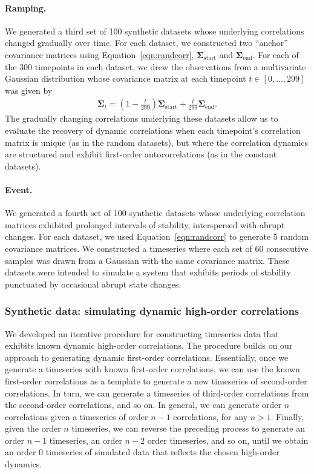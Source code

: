 \documentclass[english]{article}
\begin{document}
  \paragraph*{Ramping.}  We generated a third set of 100 synthetic
  datasets whose underlying correlations changed gradually over time.
  For each dataset, we constructed two ``anchor'' covariance
  matrices using Equation~\ref{eqn:randcorr},
  $\mathbf{\Sigma}_{\mathrm{start}}$ and
  $\mathbf{\Sigma}_{\mathrm{end}}$.  For each of the 300 timepoints in
  each dataset, we drew the observations from a multivariate Gaussian
  distribution whose covariance matrix at each timepoint $t \in
  \left[0, ..., 299\right]$ was given by
  \begin{align}
    \mathbf{\Sigma}_t = \left( 1 - \frac{t}{299} \right)
    \mathbf{\Sigma}_{\mathrm{start}} + \frac{t}{299}\mathbf{\Sigma}_{\mathrm{end}}.
  \end{align}
The gradually changing correlations underlying these datasets allow us
to evaluate the recovery of dynamic correlations when each timepoint's
correlation matrix is unique (as in the random datasets), but where
the correlation dynamics are structured and exhibit first-order
autocorrelations (as in the constant datasets).
  
\paragraph*{Event.} We generated a fourth set of 100 synthetic datasets
whose underlying correlation matrices exhibited prolonged intervals of
stability, interspersed with abrupt changes.  For each dataset, we
used Equation~\ref{eqn:randcorr} to generate 5 random covariance
matrices.  We constructed a timeseries where each set of 60 consecutive samples
was drawn from a Gaussian with the same covariance matrix.  These
datasets were intended to simulate a system that exhibits periods of
stability punctuated by occasional abrupt state changes.

\subsubsection*{Synthetic data: simulating dynamic high-order
  correlations}

We developed an iterative procedure for constructing timeseries data
that exhibits known dynamic high-order correlations.  The procedure
builds on our approach to generating dynamic first-order correlations.
Essentially, once we generate a timeseries with known first-order
correlations, we can use the known first-order correlations as a
template to generate a new timeseries of second-order correlations.
In turn, we can generate a timeseries of third-order correlations from
the second-order correlations, and so on.  In general, we can generate
order $n$ correlations given a timeseries of order $n - 1$ correlations,
for any $n > 1$.  Finally, given the order $n$ timeseries, we can
reverse the preceding process to generate an order $n - 1$ timeseries, an
order $n - 2$ order timeseries, and so on, until we obtain an order 0
timeseries of simulated data that reflects the chosen high-order
dynamics.
\end{document}
